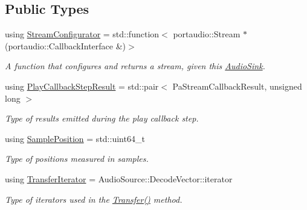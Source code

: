 \subsection*{Public Types}
\begin{DoxyCompactItemize}
\item 
using \hyperlink{classAudioSink_ae5b8370aa17c24c6fc8f8e0c5778168c}{Stream\+Configurator} = std\+::function$<$ portaudio\+::\+Stream $\ast$(portaudio\+::\+Callback\+Interface \&)$>$
\begin{DoxyCompactList}\small\item\em A function that configures and returns a stream, given this \hyperlink{classAudioSink}{Audio\+Sink}. \end{DoxyCompactList}\item 
\hypertarget{classAudioSink_a73002cc57611ac384c4e9d419e706e50}{using \hyperlink{classAudioSink_a73002cc57611ac384c4e9d419e706e50}{Play\+Callback\+Step\+Result} = std\+::pair$<$ Pa\+Stream\+Callback\+Result, unsigned long $>$}\label{classAudioSink_a73002cc57611ac384c4e9d419e706e50}

\begin{DoxyCompactList}\small\item\em Type of results emitted during the play callback step. \end{DoxyCompactList}\item 
\hypertarget{classAudioSink_ad2d7d33b3e937d057a4d72afad812737}{using \hyperlink{classAudioSink_ad2d7d33b3e937d057a4d72afad812737}{Sample\+Position} = std\+::uint64\+\_\+t}\label{classAudioSink_ad2d7d33b3e937d057a4d72afad812737}

\begin{DoxyCompactList}\small\item\em Type of positions measured in samples. \end{DoxyCompactList}\item 
\hypertarget{classAudioSink_a60c1743d66e02b77f04791e72fa4cd0b}{using \hyperlink{classAudioSink_a60c1743d66e02b77f04791e72fa4cd0b}{Transfer\+Iterator} = Audio\+Source\+::\+Decode\+Vector\+::iterator}\label{classAudioSink_a60c1743d66e02b77f04791e72fa4cd0b}

\begin{DoxyCompactList}\small\item\em Type of iterators used in the \hyperlink{classAudioSink_a455e211f4f16eaa21e7b75412cc8a8ae}{Transfer()} method. \end{DoxyCompactList}\end{DoxyCompactItemize}
